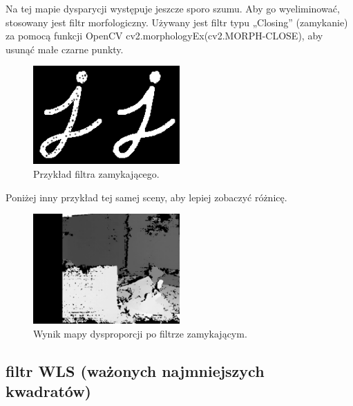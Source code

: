 \documentclass[magisterska]{pracadypl}
\begin{document}
Na tej mapie dysparycji występuje jeszcze sporo szumu. Aby go wyeliminować, stosowany jest filtr morfologiczny. Używany jest filtr typu „Closing” (zamykanie) za pomocą funkcji OpenCV cv2.morphologyEx(cv2.MORPH-CLOSE), aby usunąć małe czarne punkty.

\begin{figure}[H]  %
    \centering  %
    \includegraphics[width=0.5\textwidth]{images/closing.png}  %
    \captionsetup{font=footnotesize}
    \caption[Przykład filtra zamykającego. https://docs.opencv.org/3.4/d9/d61/tutorial-py-morphological-ops.html]{Przykład filtra zamykającego.}
\end{figure}

Poniżej inny przykład tej samej sceny, aby lepiej zobaczyć różnicę.

\begin{figure}[H]  %
    \centering  %
    \includegraphics[width=0.5\textwidth]{images/dopracy4.png}  %
    \captionsetup{font=footnotesize}
    \caption[Wynik mapy dysproporcji po filtrze zamykającym. Opracowanie własne.]{Wynik mapy dysproporcji po filtrze zamykającym.}
\end{figure}

\subsection{filtr WLS (ważonych najmniejszych kwadratów)}
\end{document}
